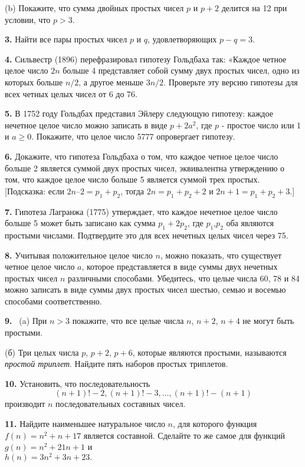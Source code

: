 \documentclass[11pt]{article}
\begin{document}
\qquad(b) Покажите, что сумма двойных простых чисел $p$ и $p+ 2$ делится на 12 при условии, что $p>3$.

\textbf{3.}	Найти все пары простых чисел $p$ и $q$, удовлетворяющих $p - q = 3$.

\textbf{4.}	Сильвестр (1896) перефразировал гипотезу Гольдбаха так: «Каждое четное целое число $2n$ больше 4 представляет собой сумму двух простых чисел, одно из которых больше $n/2$, а другое меньше $3n/2$. Проверьте эту версию гипотезы для всех четных целых чисел от 6 до 76.

\textbf{5.}	В 1752 году Гольдбах представил Эйлеру следующую гипотезу: каждое нечетное целое число можно записать в виде $p + 2a^2$, где $p$ - простое число или 1 и $ a \geq 0$. Покажите, что целое число 5777 опровергает гипотезу.

\textbf{6.}	Докажите, что гипотеза Гольдбаха о том, что каждое четное целое число больше 2 является суммой двух простых чисел, эквивалентна утверждению о том, что каждое целое число больше 5 является суммой трех простых. [Подсказка: если $2n–2=
p_1+p_2$, тогда $2n = p_1+p_2+2$ и $2n+1 = p_1 + p_2 + 3$.]

\textbf{7.}	Гипотеза Лагранжа (1775) утверждает, что каждое нечетное целое число больше 5 может быть записано как сумма $p_1 + 2p_2$, где $p_1$,$p_2$ оба являются простыми числами. Подтвердите это для всех нечетных целых чисел через 75.

\textbf{8.}	Учитывая положительное целое число $n$, можно показать, что существует четное целое число $a$, которое представляется в виде суммы двух нечетных простых чисел $n$ различными способами. Убедитесь, что целые числа 60, 78 и 84 можно записать в виде суммы двух простых чисел шестью, семью и восемью способами соответственно.

\textbf{9. } ~(a) При $n> 3$ покажите, что все целые числа $n$, $n + 2$, $n + 4$ не могут быть простыми.

\qquad(б) Три целых числа $p$, $p + 2$, $p + 6$, которые являются простыми, называются \textit{простой триплет}. Найдите пять наборов простых триплетов.

\textbf{10.	}Установить, что последовательность 
\[
(n+1)!-2, (n+1)!-3, \ldots,(n+1)!-(n+1)
\]
производит $n$ последовательных составных чисел.

\textbf{11.}	Найдите наименьшее натуральное число $n$, для которого функция $f(n) = n^2 + n +17$ является составной. Сделайте то же самое для функций $g (n) = n^2+ 21n + 1$ и \\
$h(n)=3n^2+ 3n + 23.$
\end{document}
